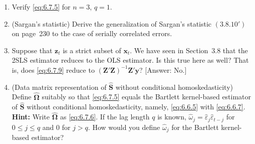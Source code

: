 \begin{enumerate}
\item Verify \eqref{eq:6.7.5} for $n = 3$, $q = 1$.

\item (Sargan's statistic) \; Derive the generalization of Sargan's statistic $(3.8.10')$ on
page~230 to the case of serially correlated errors.

\item Suppose that $\mathbf{z}_t$ is a strict subset of $\mathbf{x}_t$. We have seen in Section~3.8 that the
2SLS estimator reduces to the OLS estimator. Is this true here as well? That
is, does \eqref{eq:6.7.9} reduce to $(\mathbf{Z}'\mathbf{Z})^{-1}\mathbf{Z}'\mathbf{y}$? [Answer: No.]

\item (Data matrix representation of $\hat{\mathbf{S}}$ without conditional homoskedasticity) \; Define
$\hat{\bm{\Omega}}$ suitably so that \eqref{eq:6.7.5} equals the Bartlett kernel-based estimator of $\hat{\mathbf{S}}$
without conditional homoskedasticity, namely, \eqref{eq:6.6.5} with \eqref{eq:6.6.7}. \textbf{Hint:} Write
$\hat{\bm{\Omega}}$ as \eqref{eq:6.7.6}. If the lag length $q$ is known, $\hat{\omega}_j = \hat{\varepsilon}_j \hat{\varepsilon}_{t-j}$ for $0 \leq j \leq q$ and 0 for
$j > q$. How would you define $\hat{\omega}_j$ for the Bartlett kernel-based estimator?
\end{enumerate}
